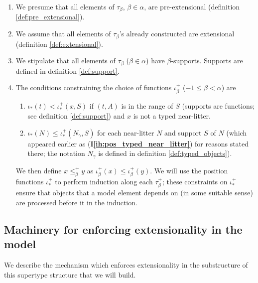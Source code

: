 \documentclass[112pt]{article}
\theoremstyle{definition}
\theoremstyle{remark}
\newcommand{\ihref}[1]{(\textbf{I\ref{#1}})}
\newcommand{\hsuggest}[1]{{\color{magenta}#1}}
\begin{document}
\begin{enumerate}
\item \label{ih:pre_extensional} We presume that all elements of $\tau_\beta$, $\beta\in \alpha$, are pre-extensional {(definition \ref{def:pre_extensional})}.   %

\item \label{ih:extensional} We assume that all elements of $\tau_\beta$'s already constructed are extensional {(definition \ref{def:extensional})}.  %

\item \label{ih:elements_have_supports} We stipulate that all elements of $\tau_\beta$ ($\beta\in\alpha$) have $\beta$-supports.  {Supports are defined in definition \ref{def:support}.}

\item \label{ih:position_constraints} The conditions constraining the choice of functions $\iota^+_\beta$ ($-1 \leq \beta < \alpha$) are

\begin{enumerate}

\item $\iota_*(t) < \iota^+_*(x,S)$ if $(t,A)$ is in the range of $S$ {(supports are functions; see definition \ref{def:support})} and $x$ is not a typed near-litter.  %

\item $\iota_*(N) \leq \iota^+_*(N_\gamma,S)$ for each near-litter $N$ and support $S$ of $N$ {(which appeared earlier as \ihref{ih:pos_typed_near_litter} for reasons stated there; the notation $N_\gamma$ is defined in definition \ref{def:typed_objects}).}  %

\end{enumerate}

We then define $x \leq^+_\beta y$ as $\iota^+_\beta(x) \leq \iota^+_\beta(y)$.  {We will use the position functions $\iota^+_*$ to perform induction along each $\tau_\beta^+$; these constraints on $\iota^+_*$ ensure that objects that a model element depends on (in some suitable sense) are processed before it in the induction.}

\end{enumerate}


\subsection{Machinery for enforcing extensionality in the model}\label{ss:extensionality_machinery}
  We describe the mechanism which enforces extensionality in the substructure of this supertype structure that we will build.
\end{document}

